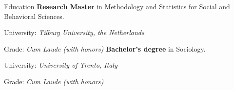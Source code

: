 \begin{rubric}{Education}
\entry*[2017 -- 2019]%
	\textbf{Research Master} in Methodology and Statistics for Social and Behavioral Sciences.
	\par University: \emph{Tilburg University, the Netherlands}
	\par Grade: \emph{Cum Laude (with honors)}
\entry*[2014 -- 2017]%
	\textbf{Bachelor's degree} in Sociology.
	\par University: \emph{University of Trento, Italy}
	\par Grade: \emph{Cum Laude (with honors)}
\end{rubric}